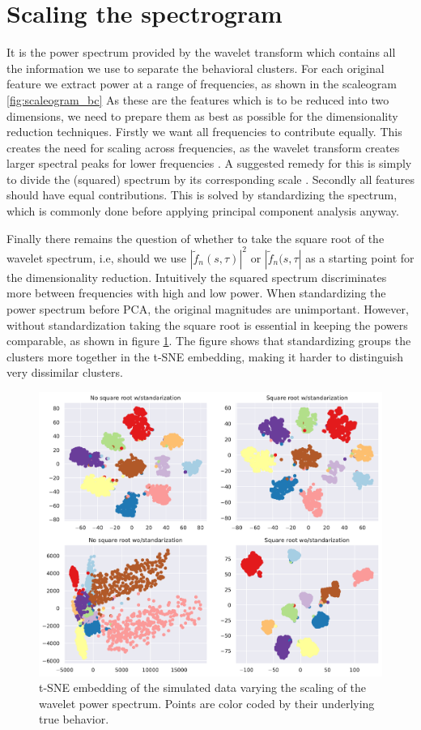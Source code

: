 \documentclass[a4paper, 10pt]{memoir}
\theoremstyle{plain}
\theoremstyle{definition}
\theoremstyle{remark}
\begin{document}
\section{Scaling the spectrogram}
It is the power spectrum provided by the wavelet transform which contains all the information we use to separate the behavioral clusters.
For each original feature we extract power at a range of frequencies, as shown in the scaleogram \ref{fig:scaleogram_bc}
As these are the features which is to be reduced into two dimensions, we need to prepare them as best as possible for the dimensionality reduction techniques.
Firstly we want all frequencies to contribute equally.
This creates the need for scaling across frequencies, as the wavelet transform creates larger spectral peaks for lower frequencies \cite{liu} \cite{berman}.
A suggested remedy for this is simply to divide the (squared) spectrum by its corresponding scale \cite{liu}.
Secondly all features should have equal contributions.
This is solved by standardizing the spectrum, which is commonly done before applying principal component analysis anyway.

Finally there remains the question of whether to take the square root of the wavelet spectrum, i.e, should we use $|\tilde{f}_n(s, \tau)|^2$ or $|\tilde{f}_n(s, \tau|$ as a starting point for the dimensionality reduction.
Intuitively the squared spectrum discriminates more between frequencies with high and low power. 
When standardizing the power spectrum before PCA, the original magnitudes are unimportant.
However, without standardization taking the square root is essential in keeping the powers comparable, as shown in figure \ref{fig:test_scaling}.
The figure shows that standardizing groups the clusters more together in the t-SNE embedding, making it harder to distinguish very dissimilar clusters.
\begin{figure}[tb]
        \centering
        \includegraphics[width=1\linewidth]{./code/figures/test_scaling.pdf}
        \caption{t-SNE embedding of the simulated data varying the scaling of the wavelet power spectrum.
        Points are color coded by their underlying true behavior.}
        \label{fig:test_scaling}
\end{figure}
\end{document}
